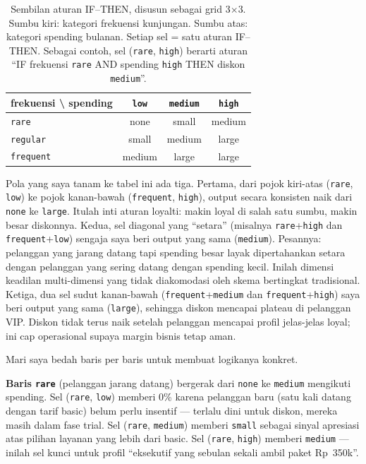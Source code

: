 \documentclass[conference]{IEEEtran}
\begin{document}
\begin{table}[h]
\caption{Sembilan aturan IF--THEN, disusun sebagai grid 3$\times$3.
Sumbu kiri: kategori frekuensi kunjungan. Sumbu atas: kategori spending
bulanan. Setiap sel = satu aturan IF--THEN. Sebagai contoh, sel
(\texttt{rare}, \texttt{high}) berarti aturan ``IF frekuensi
\texttt{rare} AND spending \texttt{high} THEN diskon \texttt{medium}''.}
\label{tab:rules}
\centering
\renewcommand{\arraystretch}{1.1}
\begin{tabular}{l|ccc}
\toprule
\textbf{frekuensi} \textbackslash{} \textbf{spending}
       & \texttt{low}    & \texttt{medium} & \texttt{high}   \\
\midrule
\texttt{rare}     & none   & small  & medium \\
\texttt{regular}  & small  & medium & large  \\
\texttt{frequent} & medium & large  & large  \\
\bottomrule
\end{tabular}
\end{table}

Pola yang saya tanam ke tabel ini ada tiga. Pertama, dari pojok
kiri-atas (\texttt{rare}, \texttt{low}) ke pojok kanan-bawah
(\texttt{frequent}, \texttt{high}), output secara konsisten naik dari
\texttt{none} ke \texttt{large}. Itulah inti aturan loyalti: makin
loyal di salah satu sumbu, makin besar diskonnya. Kedua, sel
diagonal yang ``setara'' (misalnya \texttt{rare}+\texttt{high} dan
\texttt{frequent}+\texttt{low}) sengaja saya beri output yang sama
(\texttt{medium}). Pesannya: pelanggan yang jarang datang tapi
spending besar layak dipertahankan setara dengan pelanggan yang sering
datang dengan spending kecil. Inilah dimensi keadilan multi-dimensi
yang tidak diakomodasi oleh skema bertingkat tradisional. Ketiga, dua
sel sudut kanan-bawah (\texttt{frequent}+\texttt{medium} dan
\texttt{frequent}+\texttt{high}) saya beri output yang sama
(\texttt{large}), sehingga diskon mencapai plateau di pelanggan VIP.
Diskon tidak terus naik setelah pelanggan mencapai profil jelas-jelas
loyal; ini cap operasional supaya margin bisnis tetap aman.

Mari saya bedah baris per baris untuk membuat logikanya konkret.

\textbf{Baris \texttt{rare}} (pelanggan jarang datang) bergerak dari
\texttt{none} ke \texttt{medium} mengikuti spending. Sel
(\texttt{rare}, \texttt{low}) memberi 0\% karena pelanggan baru
(satu kali datang dengan tarif basic) belum perlu insentif --- terlalu
dini untuk diskon, mereka masih dalam fase trial. Sel (\texttt{rare},
\texttt{medium}) memberi \texttt{small} sebagai sinyal apresiasi atas
pilihan layanan yang lebih dari basic. Sel (\texttt{rare},
\texttt{high}) memberi \texttt{medium} --- inilah sel kunci untuk
profil ``eksekutif yang sebulan sekali ambil paket Rp~350k''.
\end{document}
